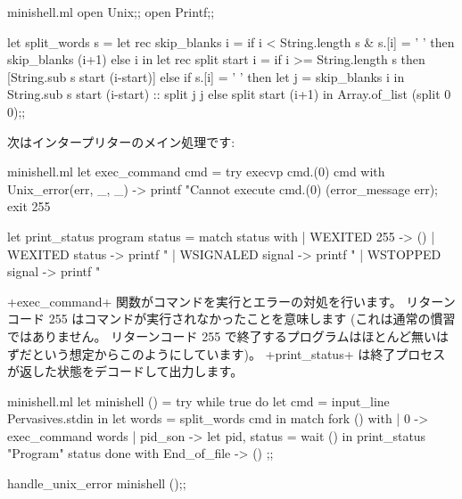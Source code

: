 \begin{listingcodefile}{minishell.ml}
open Unix;;
open Printf;;

let split_words s =
 let rec skip_blanks i =
   if i < String.length s & s.[i] = ' '
   then skip_blanks (i+1)
   else i in
 let rec split start i =
   if i >= String.length s then
     [String.sub s start (i-start)]
   else if s.[i] = ' ' then
     let j = skip_blanks i in
     String.sub s start (i-start) :: split j j
   else
     split start (i+1) in
 Array.of_list (split 0 0);;
\end{listingcodefile}
%
次はインタープリターのメイン処理です:
%
\begin{listingcodefile}{minishell.ml}
let exec_command cmd =
 try execvp cmd.(0) cmd
 with Unix_error(err, _, _) ->
   printf "Cannot execute %
     cmd.(0) (error_message err);
   exit 255

let print_status program status =
 match status with
 | WEXITED 255 -> ()
 | WEXITED status ->
     printf "%
 | WSIGNALED signal ->
     printf "%
 | WSTOPPED signal ->
     printf "%
\end{listingcodefile}
%
\ml+exec_command+ 関数がコマンドを実行とエラーの対処を行います。
リターンコード 255 はコマンドが実行されなかったことを意味します (これは通常の慣習ではありません。
リターンコード 255 で終了するプログラムはほとんど無いはずだという想定からこのようにしています)。
\ml+print_status+ は終了プロセスが返した状態をデコードして出力します。
%
\begin{listingcodefile}{minishell.ml}
let minishell () =
 try
   while true do
     let cmd = input_line Pervasives.stdin in
     let words = split_words cmd in
     match fork () with
     | 0 -> exec_command words
     | pid_son ->
         let pid, status = wait () in
         print_status "Program" status
   done
 with End_of_file -> ()
;;

handle_unix_error minishell ();;
\end{listingcodefile}
%

